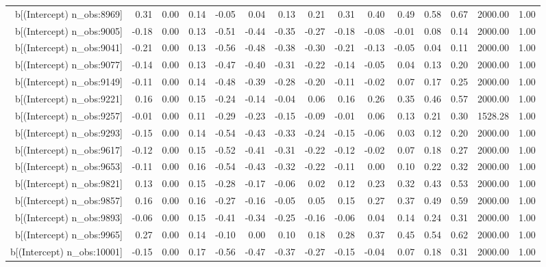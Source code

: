 \begin{table}[ht]
\begin{tabular}{rrrrrrrrrrrrrrr}
  b[(Intercept) n\_obs:8969] & 0.31 & 0.00 & 0.14 & -0.05 & 0.04 & 0.13 & 0.21 & 0.31 & 0.40 & 0.49 & 0.58 & 0.67 & 2000.00 & 1.00 \\ 
  b[(Intercept) n\_obs:9005] & -0.18 & 0.00 & 0.13 & -0.51 & -0.44 & -0.35 & -0.27 & -0.18 & -0.08 & -0.01 & 0.08 & 0.14 & 2000.00 & 1.00 \\ 
  b[(Intercept) n\_obs:9041] & -0.21 & 0.00 & 0.13 & -0.56 & -0.48 & -0.38 & -0.30 & -0.21 & -0.13 & -0.05 & 0.04 & 0.11 & 2000.00 & 1.00 \\ 
  b[(Intercept) n\_obs:9077] & -0.14 & 0.00 & 0.13 & -0.47 & -0.40 & -0.31 & -0.22 & -0.14 & -0.05 & 0.04 & 0.13 & 0.20 & 2000.00 & 1.00 \\ 
  b[(Intercept) n\_obs:9149] & -0.11 & 0.00 & 0.14 & -0.48 & -0.39 & -0.28 & -0.20 & -0.11 & -0.02 & 0.07 & 0.17 & 0.25 & 2000.00 & 1.00 \\ 
  b[(Intercept) n\_obs:9221] & 0.16 & 0.00 & 0.15 & -0.24 & -0.14 & -0.04 & 0.06 & 0.16 & 0.26 & 0.35 & 0.46 & 0.57 & 2000.00 & 1.00 \\ 
  b[(Intercept) n\_obs:9257] & -0.01 & 0.00 & 0.11 & -0.29 & -0.23 & -0.15 & -0.09 & -0.01 & 0.06 & 0.13 & 0.21 & 0.30 & 1528.28 & 1.00 \\ 
  b[(Intercept) n\_obs:9293] & -0.15 & 0.00 & 0.14 & -0.54 & -0.43 & -0.33 & -0.24 & -0.15 & -0.06 & 0.03 & 0.12 & 0.20 & 2000.00 & 1.00 \\ 
  b[(Intercept) n\_obs:9617] & -0.12 & 0.00 & 0.15 & -0.52 & -0.41 & -0.31 & -0.22 & -0.12 & -0.02 & 0.07 & 0.18 & 0.27 & 2000.00 & 1.00 \\ 
  b[(Intercept) n\_obs:9653] & -0.11 & 0.00 & 0.16 & -0.54 & -0.43 & -0.32 & -0.22 & -0.11 & 0.00 & 0.10 & 0.22 & 0.32 & 2000.00 & 1.00 \\ 
  b[(Intercept) n\_obs:9821] & 0.13 & 0.00 & 0.15 & -0.28 & -0.17 & -0.06 & 0.02 & 0.12 & 0.23 & 0.32 & 0.43 & 0.53 & 2000.00 & 1.00 \\ 
  b[(Intercept) n\_obs:9857] & 0.16 & 0.00 & 0.16 & -0.27 & -0.16 & -0.05 & 0.05 & 0.15 & 0.27 & 0.37 & 0.49 & 0.59 & 2000.00 & 1.00 \\ 
  b[(Intercept) n\_obs:9893] & -0.06 & 0.00 & 0.15 & -0.41 & -0.34 & -0.25 & -0.16 & -0.06 & 0.04 & 0.14 & 0.24 & 0.31 & 2000.00 & 1.00 \\ 
  b[(Intercept) n\_obs:9965] & 0.27 & 0.00 & 0.14 & -0.10 & 0.00 & 0.10 & 0.18 & 0.28 & 0.37 & 0.45 & 0.54 & 0.62 & 2000.00 & 1.00 \\ 
  b[(Intercept) n\_obs:10001] & -0.15 & 0.00 & 0.17 & -0.56 & -0.47 & -0.37 & -0.27 & -0.15 & -0.04 & 0.07 & 0.18 & 0.31 & 2000.00 & 1.00 \\ 

\end{tabular}
\end{table}
